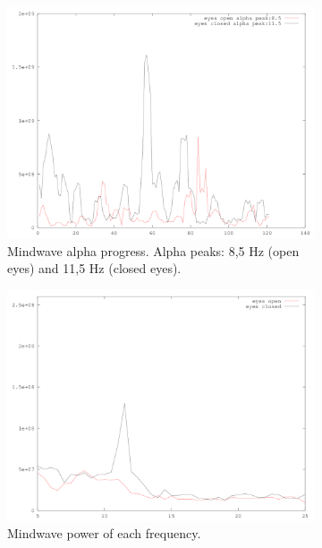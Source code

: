 \documentclass[a4paper,10pt,english,lof,lot,twoside]{puthesis}
\begin{document}
\begin{figure}
\begin{subfigure}[t]{0.49\linewidth}
\includegraphics[width=1.000\linewidth]{experiment-final-13-mindwave-alpha-progress.png}
\caption[EPOC alpha progress.]{Mindwave alpha progress. Alpha peaks: 8,5 Hz (open eyes) and 11,5 Hz (closed eyes).}\label{ch-experiment/index:fig-experiment-final-13-mindwave-alpha-progress}\end{subfigure}
\begin{subfigure}[t]{0.49\linewidth}
\centering
\capstart

\includegraphics[width=1.000\linewidth]{experiment-final-13-mindwave-pwelch-power.png}
\caption[Mindwave power of each frequency.]{Mindwave power of each frequency.}\label{ch-experiment/index:fig-experiment-final-13-mindwave-alpha-power}\end{subfigure}
\begin{subfigure}[t]{0.49\linewidth}
\centering
\capstart


\end{subfigure}
\end{figure}
\end{document}
